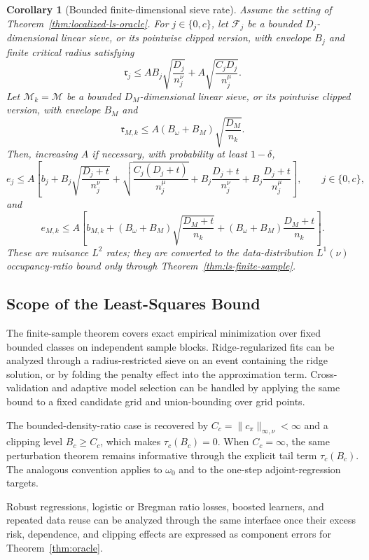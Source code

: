 \documentclass{article}
\newcommand{\sF}{\mathcal{F}}
\newcommand{\sM}{\mathcal{M}}
\newcommand{\1}{\mathbf{1}}
\newcommand{\cpi}{c_\pi}
\newcommand{\omegazero}{\omega_0}
\newcommand{\crit}{\mathfrak{r}}
\theoremstyle{plain}
\newtheorem{corollary}[theorem]{Corollary}
\theoremstyle{definition}
\theoremstyle{remark}
\begin{document}
\begin{corollary}[Bounded finite-dimensional sieve rate]
\label{cor:finite-dimensional-ls}
Assume the setting of Theorem~\ref{thm:localized-ls-oracle}.
For $j\in\{0,c\}$, let $\sF_j$ be a bounded $D_j$-dimensional linear sieve, or its pointwise clipped version, with envelope $B_j$ and finite critical radius satisfying
\[
    \crit_j
    \le
    A B_j\sqrt{\frac{D_j}{n_j^\nu}}
    +
    A\sqrt{\frac{C_jD_j}{n_j^\mu}}.
\]
Let $\sM_k=\sM$ be a bounded $D_M$-dimensional linear sieve, or its pointwise clipped version, with envelope $B_M$ and
\[
    \crit_{M,k}
    \le
    A(B_\omega+B_M)\sqrt{\frac{D_M}{n_k}}.
\]
Then, increasing $A$ if necessary, with probability at least $1-\delta$,
\[
    e_j
    \le
    A\left[
        b_j
        +B_j\sqrt{\frac{D_j+t}{n_j^\nu}}
        +\sqrt{\frac{C_j(D_j+t)}{n_j^\mu}}
        +B_j\frac{D_j+t}{n_j^\nu}
        +B_j\frac{D_j+t}{n_j^\mu}
    \right],
    \qquad j\in\{0,c\},
\]
and
\[
    e_{M,k}
    \le
    A\left[
        b_{M,k}
        +(B_\omega+B_M)\sqrt{\frac{D_M+t}{n_k}}
        +(B_\omega+B_M)\frac{D_M+t}{n_k}
    \right].
\]
These are nuisance $L^2$ rates; they are converted to the data-distribution $L^1(\nu)$ occupancy-ratio bound only through Theorem~\ref{thm:ls-finite-sample}.
\end{corollary}

\subsection{Scope of the Least-Squares Bound}
\label{sec:ls-scope}

The finite-sample theorem covers exact empirical minimization over fixed bounded classes on independent sample blocks.
Ridge-regularized fits can be analyzed through a radius-restricted sieve on an event containing the ridge solution, or by folding the penalty effect into the approximation term.
Cross-validation and adaptive model selection can be handled by applying the same bound to a fixed candidate grid and union-bounding over grid points.

The bounded-density-ratio case is recovered by $C_c=\|\cpi\|_{\infty,\nu}<\infty$ and a clipping level $B_c\ge C_c$, which makes $\tau_c(B_c)=0$.
When $C_c=\infty$, the same perturbation theorem remains informative through the explicit tail term $\tau_c(B_c)$.
The analogous convention applies to $\omegazero$ and to the one-step adjoint-regression targets.

Robust regressions, logistic or Bregman ratio losses, boosted learners, and repeated data reuse can be analyzed through the same interface once their excess risk, dependence, and clipping effects are expressed as component errors for Theorem~\ref{thm:oracle}.
\end{document}
